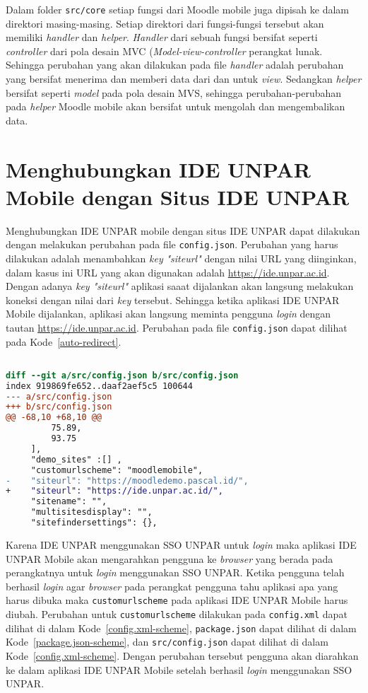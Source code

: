 Dalam folder \texttt{src/core} setiap fungsi dari Moodle mobile juga dipisah ke dalam direktori masing-masing. Setiap direktori dari fungsi-fungsi tersebut akan memiliki \textit{handler} dan \textit{helper}. \textit{Handler} dari sebuah fungsi bersifat seperti \textit{controller} dari pola desain MVC (\textit{Model-view-controller} perangkat lunak. Sehingga perubahan yang akan dilakukan pada file \textit{handler} adalah perubahan yang bersifat menerima dan memberi data dari dan untuk \textit{view}. Sedangkan \textit{helper} bersifat seperti \textit{model} pada pola desain MVS, sehingga perubahan-perubahan pada \textit{helper} Moodle mobile akan bersifat untuk mengolah dan mengembalikan data.

\section{Menghubungkan IDE UNPAR Mobile dengan Situs IDE UNPAR}

Menghubungkan IDE UNPAR mobile dengan situs IDE UNPAR dapat dilakukan dengan melakukan perubahan pada file \texttt{config.json}.  Perubahan yang harus dilakukan adalah menambahkan \textit{key} \textit{"siteurl"} dengan nilai URL yang diinginkan, dalam kasus ini URL yang akan digunakan adalah \url{https://ide.unpar.ac.id}. Dengan adanya \textit{key "siteurl"} aplikasi saaat dijalankan akan langsung melakukan koneksi dengan nilai dari \textit{key} tersebut. Sehingga ketika aplikasi IDE UNPAR Mobile dijalankan, aplikasi akan langsung meminta pengguna \textit{login} dengan tautan \url{https://ide.unpar.ac.id}. Perubahan pada file \texttt{config.json} dapat dilihat pada \mbox{Kode \ref{auto-redirect}}. 

\begin{lstlisting}[language=diff, frame=single, label ={auto-redirect}, caption = Perubahan pada file \texttt{config.json} ]

diff --git a/src/config.json b/src/config.json
index 919869fe652..daaf2aef5c5 100644
--- a/src/config.json
+++ b/src/config.json
@@ -68,10 +68,10 @@
         75.89,
         93.75
     ],
     "demo_sites" :[] ,
     "customurlscheme": "moodlemobile",
-    "siteurl": "https://moodledemo.pascal.id/",
+    "siteurl": "https://ide.unpar.ac.id/",
     "sitename": "",
     "multisitesdisplay": "",
     "sitefindersettings": {},
\end{lstlisting} 

Karena IDE UNPAR menggunakan SSO UNPAR untuk \textit{login} maka aplikasi IDE UNPAR Mobile akan mengarahkan pengguna ke \textit{browser} yang berada pada perangkatnya untuk \textit{login} menggunakan SSO UNPAR. Ketika pengguna telah berhasil \textit{login} agar \textit{browser} pada perangkat pengguna tahu aplikasi apa yang harus dibuka maka \texttt{customurlscheme} pada aplikasi IDE UNPAR Mobile harus diubah. Perubahan untuk \texttt{customurlscheme} dilakukan pada \texttt{config.xml} dapat dilihat di dalam \mbox{Kode \ref{config.xml-scheme}},  \texttt{package.json} dapat dilihat di dalam \mbox{Kode \ref{package.json-scheme}},  dan \texttt{src/config.json} dapat dilihat di dalam \mbox{Kode \ref{config.xml-scheme}}. Dengan perubahan tersebut pengguna akan diarahkan ke dalam aplikasi IDE UNPAR Mobile setelah berhasil \textit{login} menggunakan SSO UNPAR.


